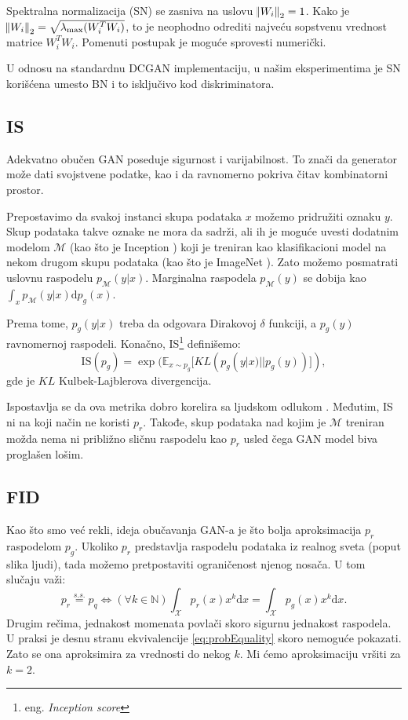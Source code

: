 \documentclass[12pt, a4paper]{article}
\begin{document}
Spektralna normalizacija (SN) \cite{SN-2018} se zasniva na uslovu $\norm{W_i}_2=1$. Kako je $\norm{W_i}_2 = \sqrt{\lambda_{\text{max}}(W^{T}_{i} W_i)}$, to je neophodno odrediti najveću sopstvenu vrednost matrice $W^{T}_{i} W_i$. Pomenuti postupak je moguće sprovesti numerički.

U odnosu na standardnu DCGAN implementaciju, u našim eksperimentima je SN korišćena umesto BN i to isključivo kod diskriminatora.

\subsection{IS}
Adekvatno obučen GAN poseduje sigurnost i varijabilnost. To znači da generator može dati svojstvene podatke, kao i da ravnomerno pokriva čitav kombinatorni prostor.

Prepostavimo da svakoj instanci skupa podataka $x$ možemo pridružiti oznaku $y$. Skup podataka takve oznake ne mora da sadrži, ali ih je moguće uvesti dodatnim modelom $\mathcal{M}$ (kao što je Inception \cite{Inception-2014}) koji je treniran kao klasifikacioni model na nekom drugom skupu podataka (kao što je ImageNet \cite{ImageNet-2014}). Zato možemo posmatrati uslovnu raspodelu $p_{\mathcal{M}}(y|x)$. Marginalna raspodela $p_{\mathcal{M}}(y)$ se dobija kao $\int_{x}p_{\mathcal{M}}(y|x)\text{d}p_g(x)$.

Prema tome, $p_g(y|x)$ treba da odgovara Dirakovoj $\delta$ funkciji, a $p_g(y)$ ravnomernoj raspodeli. Konačno, IS\footnote{eng. \textit{Inception score}} definišemo:
\begin{equation}
\text{IS}(p_g) = \exp(\mathbb{E}_{x \sim p_g}[KL(p_g(y|x)||p_g(y))]),
\end{equation}
gde je $KL$ Kulbek-Lajblerova divergencija.

Ispostavlja se da ova metrika dobro korelira sa ljudskom odlukom \cite{IS-2016}. Međutim, IS ni na koji način ne koristi $p_r$. Takođe, skup podataka nad kojim je $\mathcal{M}$ treniran možda nema ni približno sličnu raspodelu kao $p_r$ usled čega GAN model biva proglašen lošim.

\subsection{FID}
Kao što smo već rekli, ideja obučavanja GAN-a je što bolja aproksimacija $p_r$ raspodelom $p_g$. Ukoliko $p_r$ predstavlja raspodelu podataka iz realnog sveta (poput slika ljudi), tada možemo pretpostaviti ograničenost njenog nosača. U tom slučaju važi:
\begin{equation}
p_r \stackrel{s.s.}{=} p_q \iff (\forall k \in \mathbb{N}) \int_{\mathcal{X}} p_r(x) x^k \text{d}x = \int_{\mathcal{X}} p_g(x) x^k \text{d}x.
\label{eq:probEquality}
\end{equation}
Drugim rečima, jednakost momenata povlači skoro sigurnu jednakost raspodela. U praksi je desnu stranu ekvivalencije \ref{eq:probEquality} skoro nemoguće pokazati. Zato se ona aproksimira za vrednosti do nekog $k$. Mi ćemo aproksimaciju vršiti za $k=2$.
\end{document}
